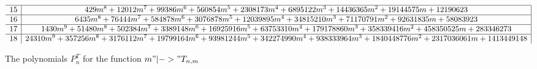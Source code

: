 \documentclass[preprint,authoryear]{elsarticle}
\begin{document}
\begin{landscape}
\begin{figure}[h]
\begin{math}
\begin{array}[h]{ r | c | }
      \hline
      15 & 429 m^{8}+12012 m^{7}+99386 m^{6}+560854 m^{5}+2308173 m^{4}+6895122 m^{3}+14436365 m^{2}+19144575 m+12190623\\
      \hline
      16 & 6435 m^{8}+76444 m^{7}+584878 m^{6}+3076878 m^{5}+12039895 m^{4}+34815210
      m^{3}+71170791 m^{2}+92631835 m+58083923\\
      \hline
      17 & 1430 m^{9}+51480 m^{8}+502384 m^{7}+3389148 m^{6}+16925916 m^{5}+63753310 m^{4}+179178860 m^{3}+358339416 m^{2}+458350525 m+283346273\\
      \hline
      18 & 24310 m^{9}+357256 m^{8}+3176112 m^{7}+19799164 m^{6}+93981244 m^{5}+342274990 m^{4}+938333964 m^{3}+1840448776 m^{2}+2317036061 m+1413449148
    \end{array}
  \end{math}
    \caption{The polynomials $P^T_n$ for the function $m"|->" T_{n,m}$}\label{fig:Pn}
    \label{fig:poly}
  \end{figure}
\end{landscape}
\end{document}

